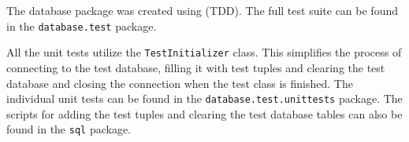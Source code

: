 The database package was created using  (TDD). The full test suite can be found in the \texttt{database.test} package.

All the unit tests utilize the \texttt{TestInitializer} class. This simplifies the process of connecting to the test database, filling it with test tuples and clearing the test database and closing the connection when the test class is finished. 
The individual unit tests can be found in the \texttt{database.test.unittests} package. The scripts for adding the test tuples and clearing the test database tables can also be found in the \texttt{sql} package.